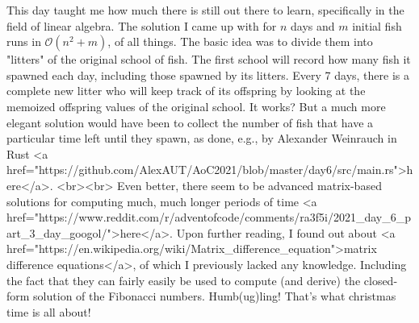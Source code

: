 This day taught me how much there is still out there to learn, specifically in the field of linear algebra. The solution I came up with for $n$ days and $m$ initial fish runs in $\mathcal{O}(n^2 + m)$, of all things. The basic idea was to divide them into "litters" of the original school of fish. The first school will record how many fish it spawned each day, including those spawned by its litters. Every 7 days, there is a complete new litter who will keep track of its offspring by looking at the memoized offspring values of the original school. It works? But a much more elegant solution would have been to collect the number of fish that have a particular time left until they spawn, as done, e.g., by Alexander Weinrauch in Rust <a href="https://github.com/AlexAUT/AoC2021/blob/master/day6/src/main.rs">here</a>. 
<br><br>
Even better, there seem to be advanced matrix-based solutions for computing much, much longer periods of time <a href="https://www.reddit.com/r/adventofcode/comments/ra3f5i/2021_day_6_part_3_day_googol/">here</a>. Upon further reading, I found out about <a href="https://en.wikipedia.org/wiki/Matrix_difference_equation">matrix difference equations</a>, of which I previously lacked any knowledge. Including the fact that they can fairly easily be used to compute (and derive) the closed-form solution of the Fibonacci numbers. Humb(ug)ling! That's what christmas time is all about! 🎄